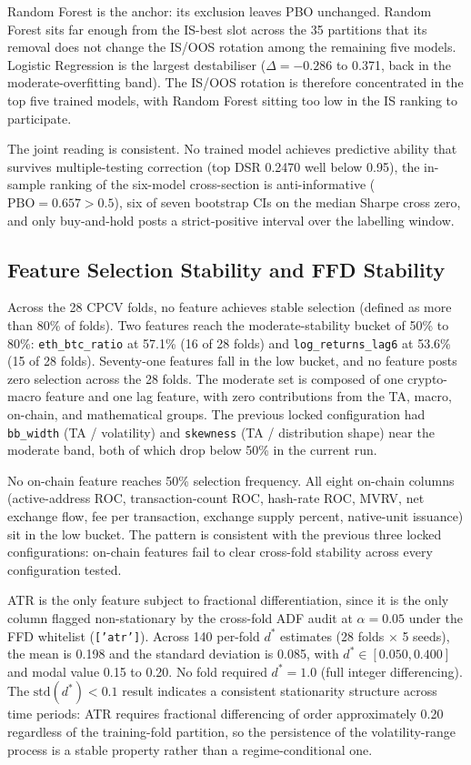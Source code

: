 \documentclass[12pt,a4paper,oneside]{article}
\begin{document}
Random Forest is the anchor: its exclusion leaves PBO unchanged. Random Forest sits far enough from the IS-best slot across the 35 partitions that its removal does not change the IS/OOS rotation among the remaining five models. Logistic Regression is the largest destabiliser ($\Delta = -0.286$ to 0.371, back in the moderate-overfitting band). The IS/OOS rotation is therefore concentrated in the top five trained models, with Random Forest sitting too low in the IS ranking to participate.

The joint reading is consistent. No trained model achieves predictive ability that survives multiple-testing correction (top DSR 0.2470 well below 0.95), the in-sample ranking of the six-model cross-section is anti-informative ($\text{PBO} = 0.657 > 0.5$), six of seven bootstrap CIs on the median Sharpe cross zero, and only buy-and-hold posts a strict-positive interval over the labelling window.


\subsection{Feature Selection Stability and FFD Stability}\label{subsec:results_features}

Across the 28 CPCV folds, no feature achieves stable selection (defined as more than 80\% of folds). Two features reach the moderate-stability bucket of 50\% to 80\%: \texttt{eth\_btc\_ratio} at 57.1\% (16 of 28 folds) and \texttt{log\_returns\_lag6} at 53.6\% (15 of 28 folds). Seventy-one features fall in the low bucket, and no feature posts zero selection across the 28 folds. The moderate set is composed of one crypto-macro feature and one lag feature, with zero contributions from the TA, macro, on-chain, and mathematical groups. The previous locked configuration had \texttt{bb\_width} (TA / volatility) and \texttt{skewness} (TA / distribution shape) near the moderate band, both of which drop below 50\% in the current run.

No on-chain feature reaches 50\% selection frequency. All eight on-chain columns (active-address ROC, transaction-count ROC, hash-rate ROC, MVRV, net exchange flow, fee per transaction, exchange supply percent, native-unit issuance) sit in the low bucket. The pattern is consistent with the previous three locked configurations: on-chain features fail to clear cross-fold stability across every configuration tested.

ATR is the only feature subject to fractional differentiation, since it is the only column flagged non-stationary by the cross-fold ADF audit at $\alpha = 0.05$ under the FFD whitelist (\texttt{['atr']}). Across 140 per-fold $d^{\ast}$ estimates (28 folds $\times$ 5 seeds), the mean is 0.198 and the standard deviation is 0.085, with $d^{\ast} \in [0.050, 0.400]$ and modal value 0.15 to 0.20. No fold required $d^{\ast} = 1.0$ (full integer differencing). The $\text{std}(d^{\ast}) < 0.1$ result indicates a consistent stationarity structure across time periods: ATR requires fractional differencing of order approximately 0.20 regardless of the training-fold partition, so the persistence of the volatility-range process is a stable property rather than a regime-conditional one.
\end{document}
